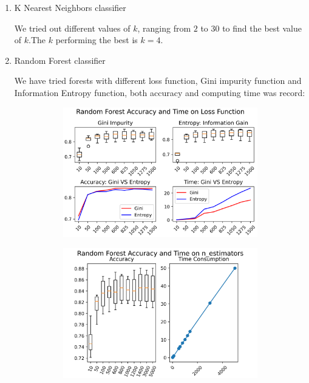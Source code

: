 \documentclass[11.5pt]{article}
\begin{document}
\begin{enumerate}
\begin{itemize}
\begin{enumerate}
                \item K Nearest Neighbors classifier

                We tried out different values of $k$, ranging from $2$ to $30$ to find the best value of $k$.The $k$ performing the best is $k = 4$.
                \item Random Forest classifier

                We have tried forests with different loss function, Gini impurity function and Information Entropy function, both accuracy and computing time was record:

                \begin{figure}[h!]
                    \begin{subfigure}[b]{0.5\linewidth}
                        \centering
                        \includegraphics[width=0.75\linewidth]{images/rand_forest_loss_func.png}
                    \end{subfigure}
                    \begin{subfigure}[b]{0.5\linewidth}
                        \centering
                        \includegraphics[width=0.75\linewidth]{images/rand_forest_n_estimators.png}
                    \end{subfigure}
                \end{figure}


\end{enumerate}
\end{itemize}
\end{enumerate}
\end{document}
